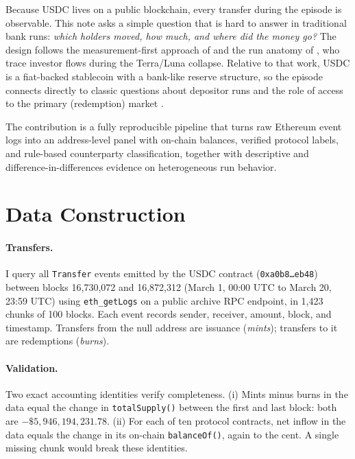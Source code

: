 \documentclass[11pt]{article}
\begin{document}
Because USDC lives on a public blockchain, every transfer during the episode is observable. This note asks a simple question that is hard to answer in traditional bank runs: \emph{which holders moved, how much, and where did the money go?} The design follows the measurement-first approach of \citet{makarov2021blockchain} and the run anatomy of \citet{liu2023anatomy}, who trace investor flows during the Terra/Luna collapse. Relative to that work, USDC is a fiat-backed stablecoin with a bank-like reserve structure, so the episode connects directly to classic questions about depositor runs and the role of access to the primary (redemption) market \citep{lyons2023stablecoins, ma2023stablecoin}.

The contribution is a fully reproducible pipeline that turns raw Ethereum event logs into an address-level panel with on-chain balances, verified protocol labels, and rule-based counterparty classification, together with descriptive and difference-in-differences evidence on heterogeneous run behavior.

\section{Data Construction}

\paragraph{Transfers.} I query all \texttt{Transfer} events emitted by the USDC contract (\texttt{0xa0b8\ldots eb48}) between blocks 16,730,072 and 16,872,312 (March 1, 00:00 UTC to March 20, 23:59 UTC) using \texttt{eth\_getLogs} on a public archive RPC endpoint, in 1,423 chunks of 100 blocks. Each event records sender, receiver, amount, block, and timestamp. Transfers from the null address are issuance (\emph{mints}); transfers to it are redemptions (\emph{burns}).

\paragraph{Validation.} Two exact accounting identities verify completeness. (i) Mints minus burns in the data equal the change in \texttt{totalSupply()} between the first and last block: both are $-\$5{,}946{,}194{,}231.78$. (ii) For each of ten protocol contracts, net inflow in the data equals the change in its on-chain \texttt{balanceOf()}, again to the cent. A single missing chunk would break these identities.
\end{document}
